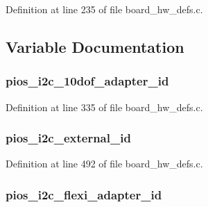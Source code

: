 Definition at line 235 of file board\-\_\-hw\-\_\-defs.\-c.



\subsection{Variable Documentation}
\hypertarget{group___tau_labs_core_ga697e424a8ada2da6558bd1576496df09}{
\subsubsection[{pios\-\_\-i2c\-\_\-10dof\-\_\-adapter\-\_\-id}]{ pios\-\_\-i2c\-\_\-10dof\-\_\-adapter\-\_\-id}}\label{group___tau_labs_core_ga697e424a8ada2da6558bd1576496df09}


Definition at line 335 of file board\-\_\-hw\-\_\-defs.\-c.

\hypertarget{group___tau_labs_core_gaf4ee551b590f93e58b18620150d923e6}{
\subsubsection[{pios\-\_\-i2c\-\_\-external\-\_\-id}]{ pios\-\_\-i2c\-\_\-external\-\_\-id}}\label{group___tau_labs_core_gaf4ee551b590f93e58b18620150d923e6}


Definition at line 492 of file board\-\_\-hw\-\_\-defs.\-c.

\hypertarget{group___tau_labs_core_ga00c59288b3ddcecb262b920ef5ae6ce1}{
\subsubsection[{pios\-\_\-i2c\-\_\-flexi\-\_\-adapter\-\_\-id}]{ pios\-\_\-i2c\-\_\-flexi\-\_\-adapter\-\_\-id}}\label{group___tau_labs_core_ga00c59288b3ddcecb262b920ef5ae6ce1}


